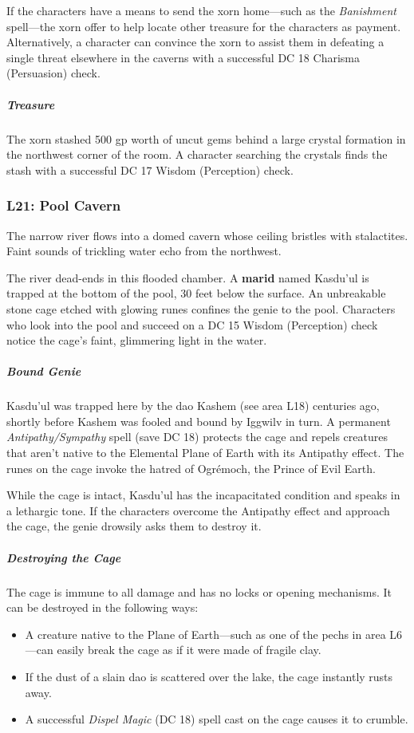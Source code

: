 \documentclass[10pt,a4paper,twoside,bg=print,twocolumn,openany,nodeprecatedcode]{dndbook}
\begin{document}
If the characters have a means to send the xorn home—such as the \textit{Banishment} spell—the xorn offer to help locate other treasure for the characters as payment. Alternatively, a character can convince the xorn to assist them in defeating a single threat elsewhere in the caverns with a successful DC 18 Charisma (Persuasion) check.

\subparagraph{Treasure}
The xorn stashed 500 gp worth of uncut gems behind a large crystal formation in the northwest corner of the room. A character searching the crystals finds the stash with a successful DC 17 Wisdom (Perception) check.

\subsubsection{L21: Pool Cavern}
\begin{DndReadAloud}{}
The narrow river flows into a domed cavern whose ceiling bristles with stalactites. Faint sounds of trickling water echo from the northwest.

\end{DndReadAloud}

The river dead-ends in this flooded chamber. A \textbf{marid} named Kasdu'ul is trapped at the bottom of the pool, 30 feet below the surface. An unbreakable stone cage etched with glowing runes confines the genie to the pool. Characters who look into the pool and succeed on a DC 15 Wisdom (Perception) check notice the cage's faint, glimmering light in the water.

\subparagraph{Bound Genie}
Kasdu'ul was trapped here by the dao Kashem (see area L18) centuries ago, shortly before Kashem was fooled and bound by Iggwilv in turn. A permanent \textit{Antipathy/Sympathy} spell (save DC 18) protects the cage and repels creatures that aren't native to the Elemental Plane of Earth with its Antipathy effect. The runes on the cage invoke the hatred of Ogrémoch, the Prince of Evil Earth.

While the cage is intact, Kasdu'ul has the incapacitated condition and speaks in a lethargic tone. If the characters overcome the Antipathy effect and approach the cage, the genie drowsily asks them to destroy it.

\subparagraph{Destroying the Cage}
The cage is immune to all damage and has no locks or opening mechanisms. It can be destroyed in the following ways:


\begin{itemize}
\item A creature native to the Plane of Earth—such as one of the pechs in area L6—can easily break the cage as if it were made of fragile clay.
\item If the dust of a slain dao is scattered over the lake, the cage instantly rusts away.
\item A successful \textit{Dispel Magic} (DC 18) spell cast on the cage causes it to crumble.
\end{itemize}
\end{document}
